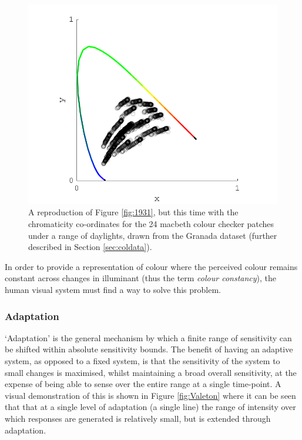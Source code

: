 \begin{figure}[htbp]
\includegraphics[max width=\textwidth]{figs/LitRev/ColorimetryDemo6.pdf}
\caption{A reproduction of Figure \ref{fig:1931}, but this time with the chromaticity co-ordinates for the 24 macbeth colour checker patches under a range of daylights, drawn from the Granada dataset \citep{hernandez-andres_color_2001} (further described in Section \ref{sec:coldata}).}
\label{fig:problem}
\end{figure}

In order to provide a representation of colour where the perceived colour remains constant across changes in illuminant (thus the term \emph{colour constancy}), the human visual system must find a way to solve this problem.

\subsubsection{Adaptation}

`Adaptation' is the general mechanism by which a finite range of sensitivity can be shifted within absolute sensitivity bounds. The benefit of having an adaptive system, as opposed to a fixed system, is that the sensitivity of the system to small changes is maximised, whilst maintaining a broad overall sensitivity, at the expense of being able to sense over the entire range at a single time-point. A visual demonstration of this is shown in Figure \ref{fig:Valeton} where it can be seen that that at a single level of adaptation (a single line) the range of intensity over which responses are generated is relatively small, but is extended through adaptation.

